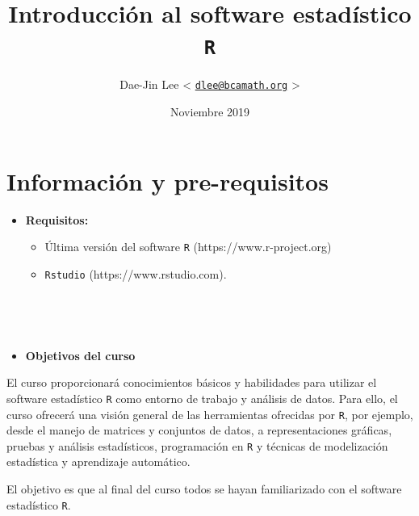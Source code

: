 \documentclass[]{book}
\title{Introducción al software estadístico \texttt{R}}
\author{Dae-Jin Lee \textless{}
\href{mailto:dlee@bcamath.org}{\nolinkurl{dlee@bcamath.org}}
\textgreater{}}
\date{Noviembre 2019}
\providecommand{\tightlist}{%
  \setlength{\itemsep}{0pt}\setlength{\parskip}{0pt}}
\begin{document}
\maketitle

{
\setcounter{tocdepth}{1}
\tableofcontents
}
\chapter{Información y
pre-requisitos}\label{informaciuxf3n-y-pre-requisitos}

\begin{itemize}
\item
  \textbf{Requisitos:}

  \begin{itemize}
  \tightlist
  \item
    Última versión del software \texttt{R} (https://www.r-project.org)
  \item
    \texttt{Rstudio} (https://www.rstudio.com).
  \end{itemize}
\end{itemize}

~

~

\begin{itemize}
\tightlist
\item
  \textbf{Objetivos del curso}
\end{itemize}

El curso proporcionará conocimientos básicos y habilidades para utilizar
el software estadístico \texttt{R} como entorno de trabajo y análisis de
datos. Para ello, el curso ofrecerá una visión general de las
herramientas ofrecidas por \texttt{R}, por ejemplo, desde el manejo de
matrices y conjuntos de datos, a representaciones gráficas, pruebas y
análisis estadísticos, programación en \texttt{R} y técnicas de
modelización estadística y aprendizaje automático.

El objetivo es que al final del curso todos se hayan familiarizado con
el software estadístico \texttt{R}.

~
\end{document}
